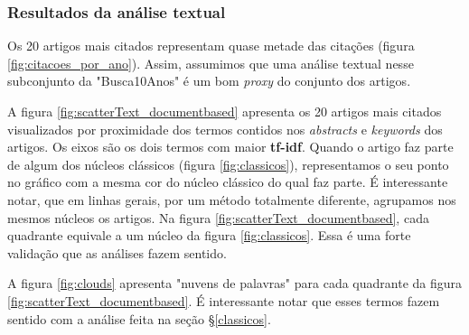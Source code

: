 \documentclass[sigconf]{acmart}
\begin{document}
\subsubsection{Resultados da análise textual}
Os 20 artigos mais citados representam quase metade das citações (figura \ref{fig:citacoes_por_ano}). Assim, assumimos que uma análise textual nesse subconjunto da "Busca10Anos" é um bom \emph{proxy} do conjunto dos artigos. 

A figura \ref{fig:scatterText_documentbased} apresenta os 20 artigos mais citados visualizados por proximidade dos termos contidos nos \emph{abstracts} e \emph{keywords} dos artigos.  Os eixos são os dois termos com maior \textbf{tf-idf}. Quando o artigo faz parte de algum dos núcleos clássicos (figura \ref{fig:classicos}), representamos o seu ponto no gráfico com a mesma cor do núcleo clássico do qual faz parte.
É interessante notar, que em linhas gerais, por um método totalmente diferente, agrupamos nos mesmos núcleos os artigos. Na figura \ref{fig:scatterText_documentbased}, cada quadrante equivale a um núcleo da figura \ref{fig:classicos}.  Essa é uma forte validação que as análises fazem sentido.

A figura \ref{fig:clouds} apresenta "nuvens de palavras" para cada quadrante da figura \ref{fig:scatterText_documentbased}. É interessante notar que esses termos fazem sentido com a análise feita na seção \S\ref{classicos}.
\end{document}
